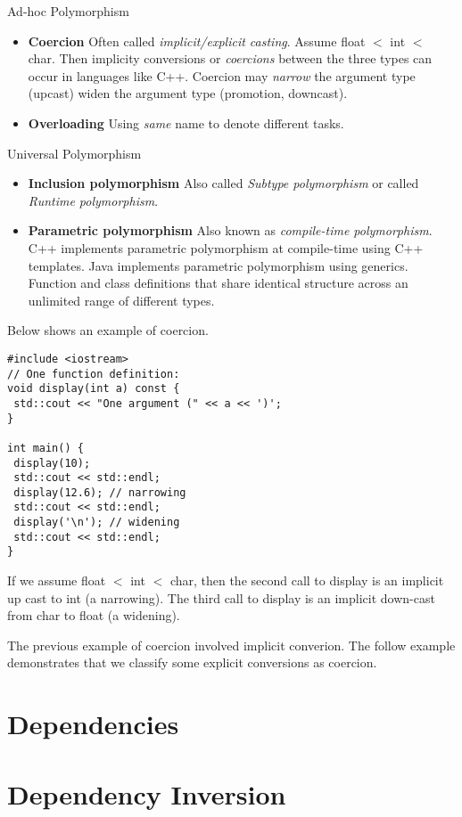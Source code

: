 Ad-hoc Polymorphism
\begin{itemize}   
\renewcommand{\labelitemi}{$\Box$}
\item \textbf{Coercion} Often called \textit{implicit/explicit casting}. Assume float $ < $ int $ < $ char. 
Then implicity conversions or \textit{coercions} between the three types can occur in languages like C++. 
Coercion may \textit{narrow} the argument type (upcast) widen the argument type (promotion, downcast). 
\item \textbf{Overloading} Using \textit{same} name to denote different tasks.
\end{itemize}

Universal Polymorphism
\begin{itemize}   
\renewcommand{\labelitemi}{$\Box$}
\item \textbf{Inclusion polymorphism} Also called \textit{Subtype polymorphism} 
or called \textit{Runtime polymorphism}. 
\item \textbf{Parametric polymorphism} Also known as \textit{compile-time polymorphism}.
C++ implements parametric polymorphism at compile-time using C++ templates. Java implements 
parametric polymorphism using generics.  Function and class definitions that share 
identical structure across an unlimited range of different types. 
\end{itemize}

\frmrule

\begin{example}
Below shows an example of coercion. 

\begin{lstlisting}
#include <iostream>
// One function definition:
void display(int a) const {
 std::cout << "One argument (" << a << ')'; 
}

int main() {
 display(10);
 std::cout << std::endl;
 display(12.6); // narrowing
 std::cout << std::endl;
 display('\n'); // widening
 std::cout << std::endl;
}
\end{lstlisting}
\end{example}

If we assume float $ < $ int $ < $ char, then the second call to display is an implicit up cast to int 
(a narrowing). The third call to display is an implicit down-cast from char to float (a widening). 

\frmrule

The previous example of coercion involved implicit converion. 
The follow example demonstrates that we classify some explicit conversions as coercion. 

\frmrule


\section{Dependencies}



\section{Dependency Inversion}
